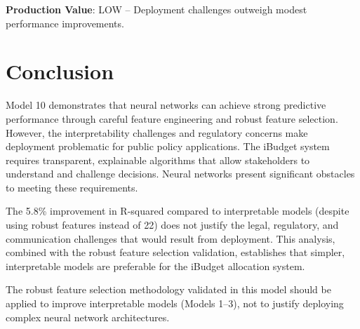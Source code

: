 \textbf{Production Value}: LOW -- Deployment challenges outweigh modest performance improvements.

\section{Conclusion}

Model 10 demonstrates that neural networks can achieve strong predictive performance through careful feature engineering and robust feature selection. However, the interpretability challenges and regulatory concerns make deployment problematic for public policy applications. The iBudget system requires transparent, explainable algorithms that allow stakeholders to understand and challenge decisions. Neural networks present significant obstacles to meeting these requirements.

The 5.8\% improvement in R-squared compared to interpretable models (despite using \ModelTenRobustFeatures{} robust features instead of 22) does not justify the legal, regulatory, and communication challenges that would result from deployment. This analysis, combined with the robust feature selection validation, establishes that simpler, interpretable models are preferable for the iBudget allocation system.

The robust feature selection methodology validated in this model should be applied to improve interpretable models (Models 1--3), not to justify deploying complex neural network architectures.